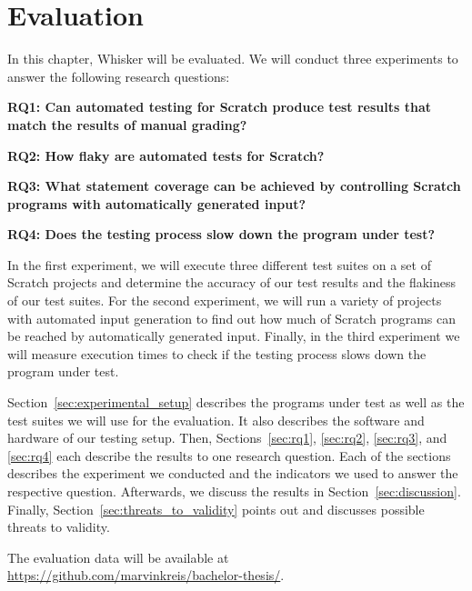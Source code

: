 \chapter{Evaluation}%
\label{cha:evaluation}

In this chapter, Whisker will be evaluated.
We will conduct three experiments to answer the following research questions:

{
    \parspace

    \centering
    \begin{minipage}{.9\textwidth}
        \textbf{RQ1: Can automated testing for Scratch produce test results that match the results of manual grading?}
        \parspace

        \textbf{RQ2: How flaky are automated tests for Scratch?}
        \parspace

        \textbf{RQ3: What statement coverage can be achieved by controlling Scratch programs with automatically generated input?}
        \parspace

        \textbf{RQ4: Does the testing process slow down the program under test?}
    \end{minipage}

    \parspace
}


\noindent In the first experiment, we will execute three different test suites on a set of Scratch projects
and determine the accuracy of our test results and the flakiness of our test suites.
For the second experiment, we will run a variety of projects with automated input generation
to find out how much of Scratch programs can be reached by automatically generated input.
Finally, in the third experiment we will measure execution times
to check if the testing process slows down the program under test.
\parspace

Section~\ref{sec:experimental_setup} describes the programs under test as well as the test suites we will use for the evaluation.
It also describes the software and hardware of our testing setup.
Then, Sections~\ref{sec:rq1}, \ref{sec:rq2}, \ref{sec:rq3}, and \ref{sec:rq4} each describe the results to one research question.
Each of the sections describes the experiment we conducted and the indicators we used
to answer the respective question.
Afterwards, we discuss the results in Section~\ref{sec:discussion}.
Finally, Section~\ref{sec:threats_to_validity} points out and discusses possible threats to validity.%
\parspace

The evaluation data will be available at \url{https://github.com/marvinkreis/bachelor-thesis/}.

